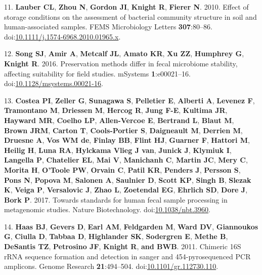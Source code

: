 \documentclass[11pt,]{article}
\begin{document}
\hypertarget{ref-Lauber2010}{}
11. \textbf{Lauber CL}, \textbf{Zhou N}, \textbf{Gordon JI},
\textbf{Knight R}, \textbf{Fierer N}. 2010. Effect of storage conditions
on the assessment of bacterial community structure in soil and
human-associated samples. FEMS Microbiology Letters \textbf{307}:80--86.
doi:\href{https://doi.org/10.1111/j.1574-6968.2010.01965.x}{10.1111/j.1574-6968.2010.01965.x}.

\hypertarget{ref-Song2016}{}
12. \textbf{Song SJ}, \textbf{Amir A}, \textbf{Metcalf JL},
\textbf{Amato KR}, \textbf{Xu ZZ}, \textbf{Humphrey G}, \textbf{Knight
R}. 2016. Preservation methods differ in fecal microbiome stability,
affecting suitability for field studies. mSystems \textbf{1}:e00021--16.
doi:\href{https://doi.org/10.1128/msystems.00021-16}{10.1128/msystems.00021-16}.

\hypertarget{ref-Costea2017}{}
13. \textbf{Costea PI}, \textbf{Zeller G}, \textbf{Sunagawa S},
\textbf{Pelletier E}, \textbf{Alberti A}, \textbf{Levenez F},
\textbf{Tramontano M}, \textbf{Driessen M}, \textbf{Hercog R},
\textbf{Jung F-E}, \textbf{Kultima JR}, \textbf{Hayward MR},
\textbf{Coelho LP}, \textbf{Allen-Vercoe E}, \textbf{Bertrand L},
\textbf{Blaut M}, \textbf{Brown JRM}, \textbf{Carton T},
\textbf{Cools-Portier S}, \textbf{Daigneault M}, \textbf{Derrien M},
\textbf{Druesne A}, \textbf{Vos WM de}, \textbf{Finlay BB},
\textbf{Flint HJ}, \textbf{Guarner F}, \textbf{Hattori M},
\textbf{Heilig H}, \textbf{Luna RA}, \textbf{Hylckama Vlieg J van},
\textbf{Junick J}, \textbf{Klymiuk I}, \textbf{Langella P},
\textbf{Chatelier EL}, \textbf{Mai V}, \textbf{Manichanh C},
\textbf{Martin JC}, \textbf{Mery C}, \textbf{Morita H}, \textbf{O'Toole
PW}, \textbf{Orvain C}, \textbf{Patil KR}, \textbf{Penders J},
\textbf{Persson S}, \textbf{Pons N}, \textbf{Popova M}, \textbf{Salonen
A}, \textbf{Saulnier D}, \textbf{Scott KP}, \textbf{Singh B},
\textbf{Slezak K}, \textbf{Veiga P}, \textbf{Versalovic J}, \textbf{Zhao
L}, \textbf{Zoetendal EG}, \textbf{Ehrlich SD}, \textbf{Dore J},
\textbf{Bork P}. 2017. Towards standards for human fecal sample
processing in metagenomic studies. Nature Biotechnology.
doi:\href{https://doi.org/10.1038/nbt.3960}{10.1038/nbt.3960}.

\hypertarget{ref-Haas2011}{}
14. \textbf{Haas BJ}, \textbf{Gevers D}, \textbf{Earl AM},
\textbf{Feldgarden M}, \textbf{Ward DV}, \textbf{Giannoukos G},
\textbf{Ciulla D}, \textbf{Tabbaa D}, \textbf{Highlander SK},
\textbf{Sodergren E}, \textbf{Methe B}, \textbf{DeSantis TZ},
\textbf{Petrosino JF}, \textbf{Knight R}, \textbf{and BWB}. 2011.
Chimeric 16S rRNA sequence formation and detection in sanger and
454-pyrosequenced PCR amplicons. Genome Research \textbf{21}:494--504.
doi:\href{https://doi.org/10.1101/gr.112730.110}{10.1101/gr.112730.110}.
\end{document}
